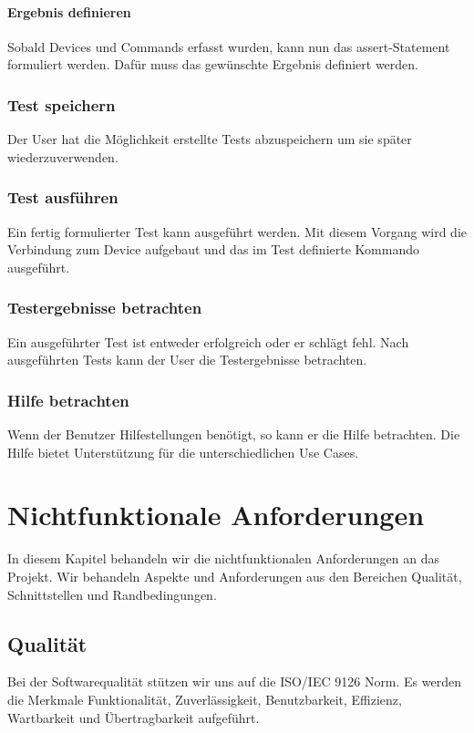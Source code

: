 \documentclass[a4,12pt]{scrartcl}
\begin{document}
\paragraph{Ergebnis definieren}\hfill

\noindent Sobald Devices und Commands erfasst wurden, kann nun das assert-Statement formuliert werden. Dafür muss das gewünschte Ergebnis definiert werden.

\subsubsection{Test speichern}
Der User hat die Möglichkeit erstellte Tests abzuspeichern um sie später wiederzuverwenden.

\subsubsection{Test ausführen}
Ein fertig formulierter Test kann ausgeführt werden. Mit diesem Vorgang wird die Verbindung zum Device aufgebaut und das im Test definierte Kommando ausgeführt. 

\subsubsection{Testergebnisse betrachten}
Ein ausgeführter Test ist entweder erfolgreich oder er schlägt fehl. Nach ausgeführten Tests kann der User die Testergebnisse betrachten.

\subsubsection{Hilfe betrachten}
Wenn der Benutzer Hilfestellungen benötigt, so kann er die Hilfe betrachten. Die Hilfe bietet Unterstützung für die unterschiedlichen Use Cases.

\newpage
\section{Nichtfunktionale Anforderungen}
In diesem Kapitel behandeln wir die nichtfunktionalen Anforderungen an das Projekt. Wir behandeln Aspekte und Anforderungen aus den Bereichen Qualität, Schnittstellen und Randbedingungen.
\subsection{Qualität}
Bei der Softwarequalität stützen wir uns auf die ISO/IEC 9126 Norm. Es werden die Merkmale Funktionalität, Zuverlässigkeit, Benutzbarkeit, Effizienz, Wartbarkeit und Übertragbarkeit aufgeführt.
\end{document}
